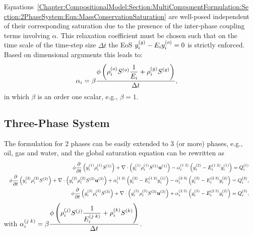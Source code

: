 Equations~\ref{Chapter:CompositionalModel:Section:MultiComponentFormulation:Section:2PhaseSystem:Eqn:MassConservationSaturation} are well-posed independent of their corresponding saturation due to the presence of the inter-phase coupling terms involving $\alpha$. This relaxation coefficient \blue{$\alpha$} must be chosen such that on the time scale of the time-step size $\Delta t$ the EoS $\mfr[y]{i}{g} - E_i \mfr[y]{i}{o}=0$ is strictly enforced. Based on dimensional arguments this leads to: 
            \begin{equation}
               \alpha_{i}= \beta \frc{\phi \left(\mfr[\rho]{i}{o}\mfr[S]{}{o} \frc{1}{E_i} +\mfr[\rho]{i}{g}\mfr[S]{}{g} \right)}{\Delta t} ,
            \end{equation}
in which $\beta$ is an order one scalar, e.g., $\beta=1$.


\subsection{Three-Phase System}\label{Chapter:CompositionalModel:Section:MultiComponentFormulation:Section:3PhaseSystem}

The formulation for 2 phases can be easily extended to 3 (or more) phases, e.g., oil, gas and water, and the global saturation equation can be rewritten as 
     \begin{subequations}
        \begin{align}
               &&\phi  \frc{\partial}{\partial t}\left(\mfr[y]{i}{1}\mfr[\rho]{i}{1}\mfr[S]{}{1} \right) + \nabla\cdot\left(\mfr[y]{i}{1}\mfr[\rho]{i}{1}\mfr[S]{}{1}\mfr[\mathbf{u}]{}{1}  \right) - \mfr[\alpha]{i}{1\;2} \left(\mfr[y]{i}{2} - \mfr[E]{i}{1\;2}\mfr[y]{i}{1}\right)  = \mfr[Q]{i}{1} \label{phase1-comp-i} \\
              && \phi \frc{\partial}{\partial t}\left(\mfr[y]{i}{2}\mfr[\rho]{i}{2}\mfr[S]{}{2} \right) +  \nabla\cdot\left( \mfr[y]{i}{2}\mfr[\rho]{i}{2}\mfr[S]{}{2}\mfr[\mathbf{u}]{}{2} \right) + \mfr[\alpha]{i}{1\;2} \left(\mfr[y]{i}{2} - \mfr[E]{i}{1\;2} \mfr[y]{i}{1}\right) - \mfr[\alpha]{i}{2\;3} \left(\mfr[y]{i}{3} - \mfr[E]{i}{2\;3} \mfr[y]{i}{2}\right) = \mfr[Q]{i}{2}, \label{phase2-comp-i} \\
              && \phi \frc{\partial}{\partial t}\left(\mfr[y]{i}{3}\mfr[\rho]{i}{3}\mfr[S]{}{3} \right) +  \nabla\cdot\left( \mfr[y]{i}{3}\mfr[\rho]{i}{3}\mfr[S]{}{3}\mfr[\mathbf{u}]{}{3}  \right) +  \mfr[\alpha]{i}{2\;3} \left(\mfr[y]{i}{3} - \mfr[E]{i}{2\;3} \mfr[y]{i}{2}\right) = \mfr[Q]{i}{3}, \label{phase3-comp-i}
       \end{align}
    \end{subequations}
with $\mfr[\alpha]{i}{j\;k} = \beta \frc{\phi \left(\mfr[\rho]{i}{j}\mfr[S]{}{j}  \frc{1}{\mfr[E]{i}{j\;k}} +\mfr[\rho]{i}{k}\mfr[S]{}{k} \right)}{\Delta t} $.


